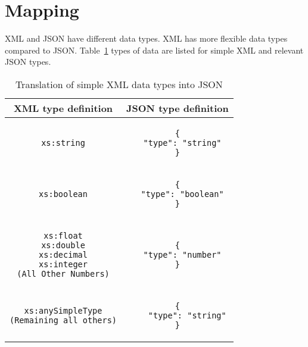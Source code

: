 \section{Mapping}
XML and JSON have different data types. XML has more flexible data types compared to JSON. Table~\ref{tbl:xml-json:types} types of data are listed for simple XML and relevant JSON types.
\begin{longtable}[hbtp]{c|c}
\caption{Translation of simple XML data types into JSON}
\label{tbl:xml-json:types}\\

\textbf{XML type definition} & \textbf{JSON type definition}\\
\hline

\begin{minipage}{.4\textwidth}
  \begin{lstlisting}
xs:string
  \end{lstlisting}
\end{minipage} &
\begin{minipage}{.4\textwidth}
\begin{lstlisting}
{
  "type": "string"
}
\end{lstlisting}
\end{minipage}\\

\hline
\begin{minipage}{.4\textwidth}
  \begin{lstlisting}
xs:boolean
  \end{lstlisting}
\end{minipage} &
\begin{minipage}{.4\textwidth}
\begin{lstlisting}
{
  "type": "boolean"
}
\end{lstlisting}
\end{minipage}\\

\hline
\begin{minipage}{.4\textwidth}
  \begin{lstlisting}
xs:float
xs:double
xs:decimal
xs:integer
(All Other Numbers)
  \end{lstlisting}
\end{minipage} &
\begin{minipage}{.4\textwidth}
\begin{lstlisting}
{
  "type": "number"
}
\end{lstlisting}
\end{minipage}\\
\hline

\begin{minipage}{.4\textwidth}
	\begin{lstlisting}
xs:anySimpleType
(Remaining all others)
	\end{lstlisting}
\end{minipage} &
\begin{minipage}{.4\textwidth}
\begin{lstlisting}
{
	"type": "string"
}
\end{lstlisting}
\end{minipage}\\
\end{longtable}


